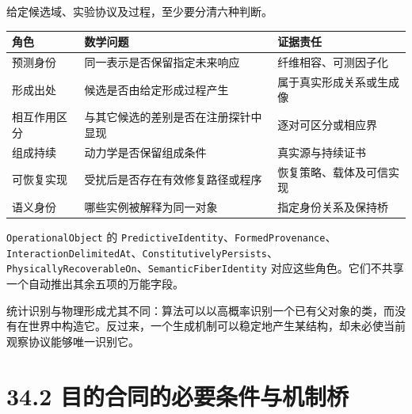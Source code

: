 \documentclass[
  11pt,
  oneside]{book}
\newcounter{none} %
\begin{document}
给定候选域、实验协议及过程，至少要分清六种判断。

{\def\LTcaptype{none} %
\begin{longtable}[]{@{}
  >{\raggedright\arraybackslash}p{}
  >{\raggedright\arraybackslash}p{}
  >{\raggedright\arraybackslash}p{}@{}}
\toprule\noalign{}
\begin{minipage}[b]{\linewidth}\raggedright
角色
\end{minipage} & \begin{minipage}[b]{\linewidth}\raggedright
数学问题
\end{minipage} & \begin{minipage}[b]{\linewidth}\raggedright
证据责任
\end{minipage} \\
\midrule\noalign{}
\endhead
\bottomrule\noalign{}
\endlastfoot
预测身份 & 同一表示是否保留指定未来响应 & 纤维相容、可测因子化 \\
形成出处 & 候选是否由给定形成过程产生 & 属于真实形成关系或生成像 \\
相互作用区分 & 与其它候选的差别是否在注册探针中显现 & 逐对可区分或相应界 \\
组成持续 & 动力学是否保留组成条件 & 真实源与持续证书 \\
可恢复实现 & 受扰后是否存在有效修复路径或程序 & 恢复策略、载体及可信实现 \\
语义身份 & 哪些实例被解释为同一对象 & 指定身份关系及保持桥 \\
\end{longtable}
}

\nolinkurl{OperationalObject} 的 \nolinkurl{PredictiveIdentity}、\nolinkurl{FormedProvenance}、\nolinkurl{InteractionDelimitedAt}、\nolinkurl{ConstitutivelyPersists}、\nolinkurl{PhysicallyRecoverableOn}、\nolinkurl{SemanticFiberIdentity} 对应这些角色。它们不共享一个自动推出其余五项的万能字段。

统计识别与物理形成尤其不同：算法可以以高概率识别一个已有父对象的类，而没有在世界中构造它。反过来，一个生成机制可以稳定地产生某结构，却未必使当前观察协议能够唯一识别它。

\section{34.2 目的合同的必要条件与机制桥}\label{ux76eeux7684ux5408ux540cux7684ux5fc5ux8981ux6761ux4ef6ux4e0eux673aux5236ux6865}
\end{document}
